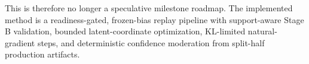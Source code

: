 This is therefore no longer a speculative milestone roadmap. The implemented method is a readiness-gated, frozen-bias replay pipeline with support-aware Stage B validation, bounded latent-coordinate optimization, KL-limited natural-gradient steps, and deterministic confidence moderation from split-half production artifacts.
